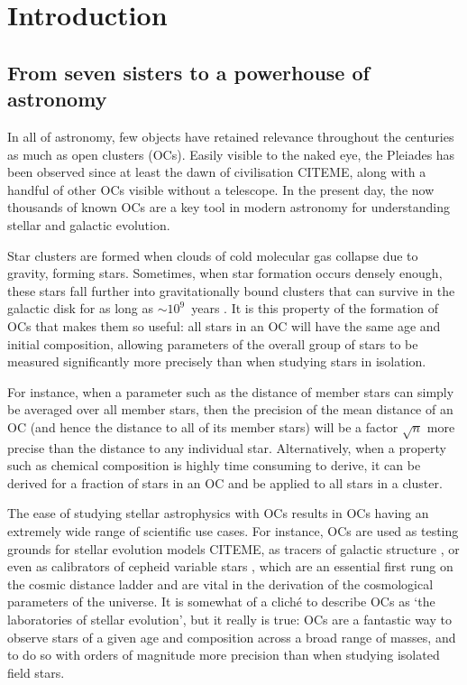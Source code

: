 %
\chapter{Introduction}
\label{sec:intro}


\section{From seven sisters to a powerhouse of astronomy}
\label{sec:intro:intro}

In all of astronomy, few objects have retained relevance throughout the centuries as much as open clusters (OCs). Easily visible to the naked eye, the Pleiades has been observed since at least the dawn of civilisation CITEME, along with a handful of other OCs visible without a telescope. In the present day, the now thousands of known OCs are a key tool in modern astronomy for understanding stellar and galactic evolution.

Star clusters are formed when clouds of cold molecular gas collapse due to gravity, forming stars. Sometimes, when star formation occurs densely enough, these stars fall further into gravitationally bound clusters that can survive in the galactic disk for as long as $\sim 10^9$~years \citep{lada_embedded_2003,portegies_zwart_young_2010}. It is this property of the formation of OCs that makes them so useful: all stars in an OC will have the same age and initial composition, allowing parameters of the overall group of stars to be measured significantly more precisely than when studying stars in isolation. 

For instance, when a parameter such as the distance of member stars can simply be averaged over all member stars, then the precision of the mean distance of an OC (and hence the distance to all of its member stars) will be a factor $\sqrt{n}$ more precise than the distance to any individual star. Alternatively, when a property such as chemical composition is highly time consuming to derive, it can be derived for a fraction of stars in an OC and be applied to all stars in a cluster.

The ease of studying stellar astrophysics with OCs results in OCs having an extremely wide range of scientific use cases. For instance, OCs are used as testing grounds for stellar evolution models CITEME, as tracers of galactic structure \citep{cantat-gaudin_painting_2020,castro-ginard_milky_2021}, or even as calibrators of cepheid variable stars \citep{medina_revisited_2021}, which are an essential first rung on the cosmic distance ladder and are vital in the derivation of the cosmological parameters of the universe. It is somewhat of a cliché to describe OCs as `the laboratories of stellar evolution', but it really is true: OCs are a fantastic way to observe stars of a given age and composition across a broad range of masses, and to do so with orders of magnitude more precision than when studying isolated field stars.


